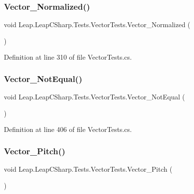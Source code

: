 \subsubsection{\texorpdfstring{Vector\_Normalized()}{Vector\_Normalized()}}
{\footnotesize\ttfamily void Leap.\+Leap\+C\+Sharp.\+Tests.\+Vector\+Tests.\+Vector\+\_\+\+Normalized (\begin{DoxyParamCaption}{ }\end{DoxyParamCaption})}



Definition at line 310 of file Vector\+Tests.\+cs.

\mbox{\label{class_leap_1_1_leap_c_sharp_1_1_tests_1_1_vector_tests_afc10e5b06ee3c3f8f8c280c3ca7b11ae}} 
\subsubsection{\texorpdfstring{Vector\_NotEqual()}{Vector\_NotEqual()}}
{\footnotesize\ttfamily void Leap.\+Leap\+C\+Sharp.\+Tests.\+Vector\+Tests.\+Vector\+\_\+\+Not\+Equal (\begin{DoxyParamCaption}{ }\end{DoxyParamCaption})}



Definition at line 406 of file Vector\+Tests.\+cs.

\mbox{\label{class_leap_1_1_leap_c_sharp_1_1_tests_1_1_vector_tests_a9dd3db807907c8a517f0cc825b0d38a2}} 
\subsubsection{\texorpdfstring{Vector\_Pitch()}{Vector\_Pitch()}}
{\footnotesize\ttfamily void Leap.\+Leap\+C\+Sharp.\+Tests.\+Vector\+Tests.\+Vector\+\_\+\+Pitch (\begin{DoxyParamCaption}{ }\end{DoxyParamCaption})}



